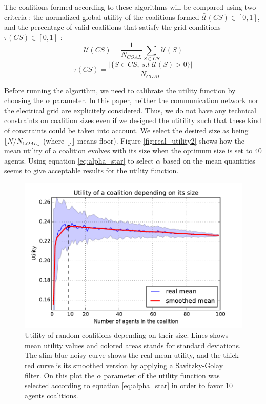 \documentclass[conference]{IEEEtran}
\begin{document}
The coalitions formed according to these algorithms will be compared using two criteria : the normalized global utility of the coalitions formed $ \bar{\mathcal{U}}(CS) \in [0,1] $, and the percentage of valid coalitions that satisfy the grid conditions $ \tau(CS) \in [0,1] $ :
\begin{equation}
	\bar{\mathcal{U}}(CS) = \dfrac{1}{N_{COAL}} \sum_{S \in CS} \mathcal{U}(S)
\end{equation}
\begin{equation}
	\tau(CS) = \dfrac{|\{ S \in CS,\ s.t\ \mathcal{U}(S) > 0 \}|}{N_{COAL}}
\end{equation}


Before running the algorithm, we need to calibrate the utility function by choosing the $ \alpha $ parameter. In this paper, neither the communication network nor the electrical grid are explicitely considered. Thus, we do not have any technical constraints on coalition sizes even if we designed the utitility such that these kind of constraints could be taken into account. We select the desired size as being $ \lfloor N/N_{COAL} \rfloor $ (where $ \lfloor.\rfloor $ means floor). Figure \ref{fig:real_utility2} shows how the mean utility of a coalition evolves with its size when the optimum size is set to 40 agents. Using equation \ref{eq:alpha_star} to select $ \alpha $ based on the mean quantities seems to give acceptable results for the utility function.

\begin{figure}
\includegraphics[scale=.6]{real_utility.pdf}
\caption{Utility of random coalitions depending on their size. Lines shows mean utility values and colored areas stands for standard deviations. The slim blue noisy curve shows the real mean utility, and the thick red curve is its smoothed version by applying a Savitzky-Golay filter. On this plot the $ \alpha $ parameter of the utility function was selected according to equation \ref{eq:alpha_star} in order to favor 10 agents coalitions.}
\label{fig:real_utility}
\end{figure}
\end{document}
